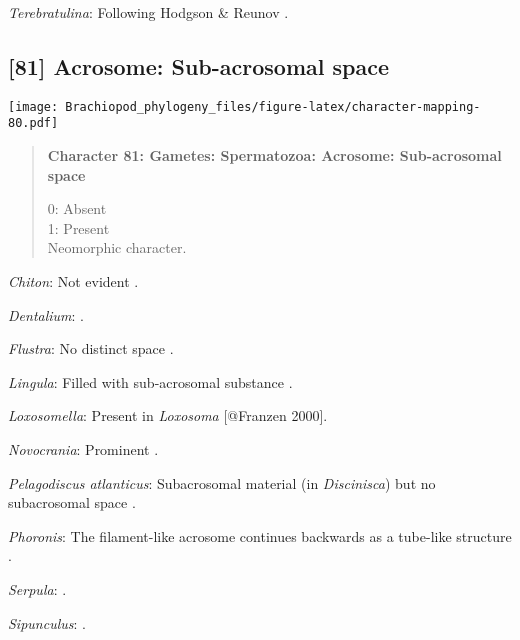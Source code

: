 \documentclass[openany]{book}
\theoremstyle{definition}
\theoremstyle{definition}
\theoremstyle{definition}
\theoremstyle{remark}
\begin{document}
\hypertarget{Terebratulina-coding-80}{}
\emph{Terebratulina}: Following Hodgson \& Reunov
\citeyearpar{Hodgson1994Ultrastructureof}.

\subsection*{{[}81{]} Acrosome: Sub-acrosomal
space}\label{acrosome-sub-acrosomal-space}

\texttt{[image: Brachiopod\_phylogeny\_files/figure-latex/character-mapping-80.pdf]}

\begin{quote}
\textbf{Character 81: Gametes: Spermatozoa: Acrosome: Sub-acrosomal
space}

0: Absent\\
1: Present\\
Neomorphic character.
\end{quote}

\hypertarget{Chiton-coding-81}{}
\emph{Chiton}: Not evident \citep{BucklandNicks1988}.

\hypertarget{Dentalium-coding-81}{}
\emph{Dentalium}: \citet{DufresneDube1983}.

\hypertarget{Flustra-coding-81}{}
\emph{Flustra}: No distinct space \citep[in
\emph{Tubulipora};][]{Franzen1984}.

\hypertarget{Lingula-coding-81}{}
\emph{Lingula}: Filled with sub-acrosomal substance
\citep{Fukumoto2003Theacrosome}.

\hypertarget{Loxosomella-coding-81}{}
\emph{Loxosomella}: Present in \emph{Loxosoma} {[}@Franzen 2000{]}.

\hypertarget{Novocrania-coding-81}{}
\emph{Novocrania}: Prominent \citep{Afzelius1978Finestructure}.

\hypertarget{Pelagodiscus_atlanticus-coding-81}{}
\emph{Pelagodiscus atlanticus}: Subacrosomal material (in
\emph{Discinisca}) but no subacrosomal space
\citep{Hodgson1994Ultrastructureof}.

\hypertarget{Phoronis-coding-81}{}
\emph{Phoronis}: The filament-like acrosome continues backwards as a
tube-like structure \citep[summarized in
\citet{Jamieson1991FishEvolution}]{Franzen1980Ultrastructureof}.

\hypertarget{Serpula-coding-81}{}
\emph{Serpula}: \citet{Gherardi2011}.

\hypertarget{Sipunculus-coding-81}{}
\emph{Sipunculus}: \citet{Rice1993}.
\end{document}
